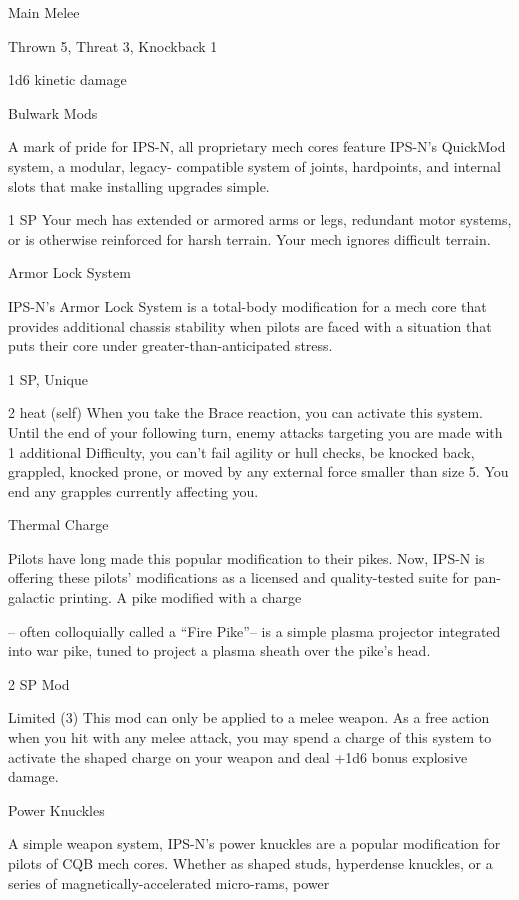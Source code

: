 Main Melee
 
Thrown 5, Threat 3, Knockback 1
 
1d6 kinetic damage
 

Bulwark Mods  

A mark of pride for IPS-N, all proprietary mech cores feature IPS-N’s QuickMod system, a modular, legacy- 
compatible system of joints, hardpoints, and internal slots that make installing upgrades simple.   

1 SP  
Your mech has extended or armored arms or legs, redundant motor systems, or is otherwise  
reinforced for harsh terrain. Your mech ignores difficult terrain.
 

Armor Lock System  

IPS-N’s Armor Lock System is a total-body modification for a mech core that provides additional chassis  
stability when pilots are faced with a situation that puts their core under greater-than-anticipated stress.   

1 SP, Unique  

2 heat (self)  
When you take the Brace reaction, you can activate this system. Until the end of your following  
turn, enemy attacks targeting you are made with 1 additional Difficulty, you can’t fail agility or hull  
checks, be knocked back, grappled, knocked prone, or moved by any external force smaller  
than size 5. You end any grapples currently affecting you.
 

Thermal Charge  

Pilots have long made this popular modification to their pikes. Now, IPS-N is offering these pilots’  
modifications as a licensed and quality-tested suite for pan-galactic printing. A pike modified with a charge  

-- often colloquially called a “Fire Pike”-- is a simple plasma projector integrated into war pike, tuned to  
project a plasma sheath over the pike’s head.  

                                                                                                                      


2 SP  
Mod  

Limited (3)  
This mod can only be applied to a melee weapon. As a free action when you hit with any melee  
attack, you may spend a charge of this system to activate the shaped charge on your weapon  
and deal +1d6 bonus explosive damage.
 

Power Knuckles  

A simple weapon system, IPS-N’s power knuckles are a popular modification for pilots of CQB mech cores.  
Whether as shaped studs, hyperdense knuckles, or a series of magnetically-accelerated micro-rams, power  


